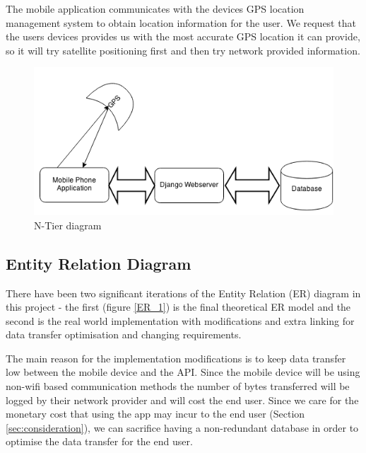 The mobile application communicates with the devices GPS location
management system to obtain location information for the
user. We request that the users devices provides us with the most
accurate GPS location it can provide, so it will try satellite
positioning first and then try network provided information.
\begin{figure}[H]
  \centering
  \includegraphics[width=\textwidth]{images/N-tier.png}
  \caption{N-Tier diagram}
  \label{NTier}
\end{figure}

\subsection{Entity Relation Diagram}
\label{sec:ER}
There have been two significant iterations of the Entity Relation (ER)
diagram in this project - the first (figure \ref{ER_1}) is the final
theoretical ER model and the second is the real world implementation
with modifications and extra linking for data transfer optimisation
and changing requirements.

The main reason for the implementation modifications is to keep data
transfer low between the mobile device and the API. Since the mobile
device will be using non-wifi based communication methods the number
of bytes transferred will be logged by their network provider and will
cost the end user. Since we care for the monetary cost that using the
app may incur to the end user (Section \ref{sec:consideration}), we can
sacrifice having a non-redundant database in order to optimise the
data transfer for the end user.

